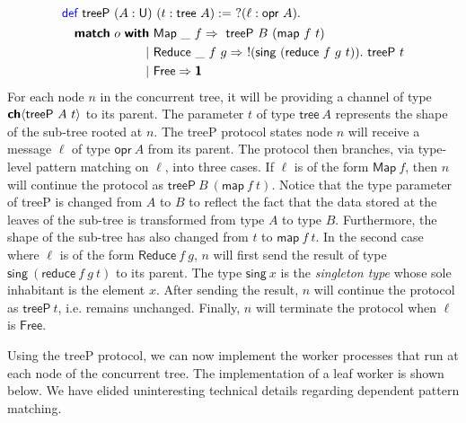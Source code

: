 \vspace{-1em}
\begingroup
\small
\addtolength{\jot}{-0.25em}
\begin{alignat*}{4}
  &\Def\ \textsf{treeP}\ (A : \Un)\ (t : \textsf{tree}\ A) :=\ ?(\ell : \textsf{opr}\ A).\\
  &\quad
    \begin{alignedat}{4}
      \Match\ o\ \With&\ \textsf{Map}\ \_\ f \Rightarrow\ \textsf{treeP}\ B\ (\textsf{map}\ f\ t) \\
                  \mid&\ \textsf{Reduce}\ \_\ f\ g \Rightarrow\ !(\textsf{sing}\ (\textsf{reduce}\ f\ g\ t)).\ \textsf{treeP}\ t \\
                  \mid&\ \textsf{Free} \Rightarrow \End
    \end{alignedat}
\end{alignat*}
\endgroup
For each node $n$ in the concurrent tree, it will be providing a channel of type
${\textbf{\textsf{ch}}\langle{\textsf{treeP}\ A\ t}\rangle}$ to its parent. The parameter $t$ of type
$\textsf{tree}\ A$ represents the shape of the sub-tree rooted at $n$. The
\textsf{treeP} protocol states node $n$ will receive a message $\ell$ of type
$\textsf{opr}\ A$ from its parent.  The protocol then branches, via type-level
pattern matching on $\ell$, into three cases. If $\ell$ is of the form
$\textsf{Map}\ f$, then $n$ will continue the protocol as
$\textsf{treeP}\ B\ (\textsf{map}\ f\ t)$. Notice that the type parameter of
\textsf{treeP} is changed from $A$ to $B$ to reflect the fact that the data
stored at the leaves of the sub-tree is transformed from type $A$ to type
$B$. Furthermore, the shape of the sub-tree has also changed from $t$ to
$\textsf{map}\ f\ t$. In the second case where $\ell$ is of the form
$\textsf{Reduce}\ f\ g$, $n$ will first send the result of type
$\textsf{sing}\ (\textsf{reduce}\ f\ g\ t)$ to its parent. The type
$\textsf{sing}\ x$ is the \emph{singleton type} whose sole inhabitant is the
element $x$. After sending the result, $n$ will continue the protocol as
$\textsf{treeP}\ t$, i.e. remains unchanged. Finally, $n$ will terminate
the protocol when $\ell$ is $\textsf{Free}$.

Using the \textsf{treeP} protocol, we can now implement the worker processes
that run at each node of the concurrent tree. The implementation of a leaf worker
is shown below. We have elided uninteresting technical details regarding dependent
pattern matching.

